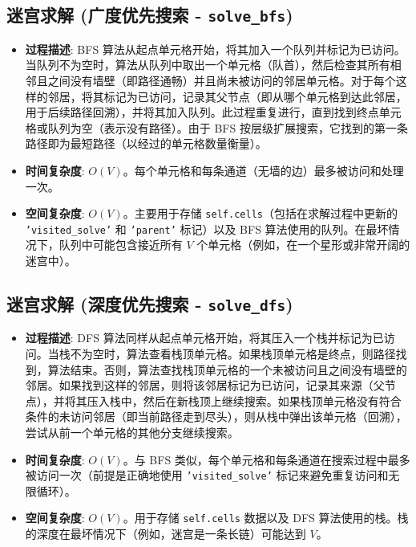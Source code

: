 \documentclass[UTF8]{report}
\theoremstyle{MyLineTheoremStyle} %
\theoremstyle{MyBlockTheoremStyle} %
\theoremstyle{MySubsubsectionStyle} %
\begin{document}
\subsection{迷宫求解 (广度优先搜索 - \texttt{solve\_bfs})}
\begin{itemize}
    \item \textbf{过程描述}: BFS 算法从起点单元格开始，将其加入一个队列并标记为已访问。当队列不为空时，算法从队列中取出一个单元格（队首），然后检查其所有相邻且之间没有墙壁（即路径通畅）并且尚未被访问的邻居单元格。对于每个这样的邻居，将其标记为已访问，记录其父节点（即从哪个单元格到达此邻居，用于后续路径回溯），并将其加入队列。此过程重复进行，直到找到终点单元格或队列为空（表示没有路径）。由于 BFS 按层级扩展搜索，它找到的第一条路径即为最短路径（以经过的单元格数量衡量）。
    \item \textbf{时间复杂度}: $O(V)$。每个单元格和每条通道（无墙的边）最多被访问和处理一次。
    \item \textbf{空间复杂度}: $O(V)$。主要用于存储 \texttt{self.cells}（包括在求解过程中更新的 \texttt{'visited\_solve'} 和 \texttt{'parent'} 标记）以及 BFS 算法使用的队列。在最坏情况下，队列中可能包含接近所有 $V$ 个单元格（例如，在一个星形或非常开阔的迷宫中）。
\end{itemize}

\subsection{迷宫求解 (深度优先搜索 - \texttt{solve\_dfs})}
\begin{itemize}
    \item \textbf{过程描述}: DFS 算法同样从起点单元格开始，将其压入一个栈并标记为已访问。当栈不为空时，算法查看栈顶单元格。如果栈顶单元格是终点，则路径找到，算法结束。否则，算法查找栈顶单元格的一个未被访问且之间没有墙壁的邻居。如果找到这样的邻居，则将该邻居标记为已访问，记录其来源（父节点），并将其压入栈中，然后在新栈顶上继续搜索。如果栈顶单元格没有符合条件的未访问邻居（即当前路径走到尽头），则从栈中弹出该单元格（回溯），尝试从前一个单元格的其他分支继续搜索。
    \item \textbf{时间复杂度}: $O(V)$。与 BFS 类似，每个单元格和每条通道在搜索过程中最多被访问一次（前提是正确地使用 \texttt{'visited\_solve'} 标记来避免重复访问和无限循环）。
    \item \textbf{空间复杂度}: $O(V)$。用于存储 \texttt{self.cells} 数据以及 DFS 算法使用的栈。栈的深度在最坏情况下（例如，迷宫是一条长链）可能达到 $V$。
\end{itemize}
\end{document}
